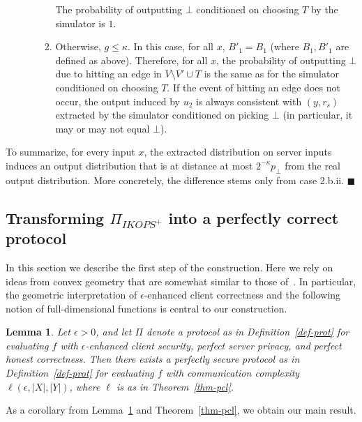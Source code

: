 \documentclass[a4paper]{article}
\newtheorem{lemma}[theorem]{Lemma}
\begin{document}
\begin{enumerate}
\begin{enumerate}
\begin{enumerate}
		The probability of outputting $\bot$ conditioned on choosing $T$ by the simulator is $1$. 
		\item Otherwise, $g\leq \kappa$. In this case, for all $x$, $B'_1=B_1$ (where $B_1,B'_1$ are defined as above). Therefore, for all $x$, the probability of outputting $\bot$ due to hitting an edge in $V\setminus{V'}\cup T$ is the same as for the simulator conditioned on choosing $T$. If the event of hitting an edge does not occur, the output induced by $u_2$ is always consistent with $(y,r_s)$ extracted by the simulator conditioned on picking $\bot$ (in particular, it may or may not equal $\bot$). 
\end{enumerate}
 	\end{enumerate}
\end{enumerate}

To summarize, for every input $x$, the extracted distribution on server inputs induces an output distribution that is at distance at most $2^{-\kappa}p_\bot$ from the real output distribution. More concretely, the difference stems only from case 2.b.ii.\hspace*{240pt} $\blacksquare$


\subsection{Transforming $\Pi_{IKOPS^+}$ into a perfectly correct protocol}

In this section we describe the first step of the construction.
Here we rely on ideas from convex geometry that are somewhat similar to those of~\cite{Ash14}. In particular, the geometric interpretation of $\epsilon$-enhanced client correctness and the following notion of full-dimensional functions is central to our construction.


\begin{lemma}\label{lem-tt-perfect}
	Let $\epsilon>0$, and let $\Pi$ denote a protocol as in Definition~\ref{def-prot} for evaluating $f$ with $\epsilon$-enhanced client security, perfect server privacy, and perfect honest correctness. Then there exists a perfectly secure protocol as in Definition~\ref{def-prot} for evaluating $f$ with communication complexity $\ell(\epsilon,|X|,|Y|)$, where $\ell$ is as in Theorem~\ref{thm-pcl}. 
\end{lemma}

As a corollary from Lemma~\ref{lem-tt-perfect} and Theorem~\ref{thm-pcl}, we obtain our main result.
\end{document}
